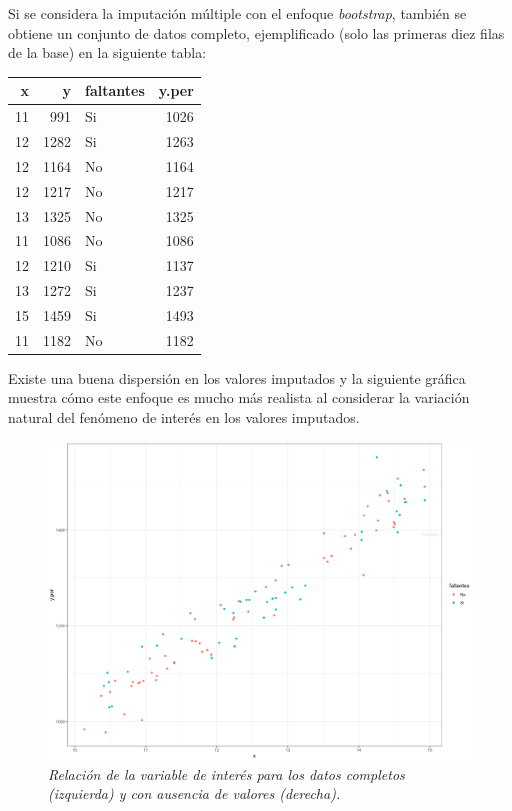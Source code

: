 \documentclass[
  10pt,
  spanish,
]{book}
\begin{document}
Si se considera la imputación múltiple con el enfoque \emph{bootstrap}, también se obtiene un conjunto de datos completo, ejemplificado (solo las primeras diez filas de la base) en la siguiente tabla:

\begin{longtable}[]{@{}rrlr@{}}
\toprule
x & y & faltantes & y.per \\
\midrule
\endhead
11 & 991 & Si & 1026 \\
12 & 1282 & Si & 1263 \\
12 & 1164 & No & 1164 \\
12 & 1217 & No & 1217 \\
13 & 1325 & No & 1325 \\
11 & 1086 & No & 1086 \\
12 & 1210 & Si & 1137 \\
13 & 1272 & Si & 1237 \\
15 & 1459 & Si & 1493 \\
11 & 1182 & No & 1182 \\
\bottomrule
\end{longtable}

Existe una buena dispersión en los valores imputados y la siguiente gráfica muestra cómo este enfoque es mucho más realista al considerar la variación natural del fenómeno de interés en los valores imputados.

\begin{figure}
\centering
\includegraphics{Pics/im3.png}
\caption{\emph{Relación de la variable de interés para los datos completos (izquierda) y con ausencia de valores (derecha).}}
\end{figure}
\end{document}
